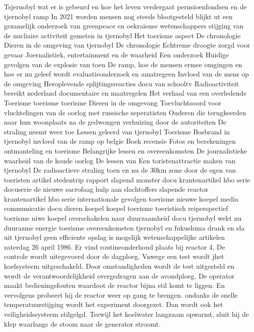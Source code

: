 \cite{INSAVienna1992Chernobyl}
Tsjernobyl
\cite{wikiTjernobyl}
\cite{rivmTjernobyl}
\cite{andereTijdenTjernobyl}
wat er is gebeurd en hoe het leven verdergaat
\cite{kingskey19042022tjernobyl}
pernsioenfondsen en de tjernobyl ramp
In 2021 worden mensen nog steeds blootgesteld blijkt ut een gezamelijk onderzoek van greenpeace en oekraiense wetenschappers
stijging van de nucliaire activiteit gemeten in tjernobyl
Het toerisme  aspect
De chronologie
\cite{erikbork26042023reactor4}
\cite{nosTjernobyl30jaarlater}
Dieren in de omgeving van tjernobyl
De chronologie
Echtreme droogte zorgd voor gevaar
\cite{knmi04052021tjernobylbosbrand}
\cite{dodonovaKVIRisicoTjernobyl}
Joernalistiek, entertainment en de waarheid
\cite{dumarey04062020verhaalTjernobylWaarheid}
Een onderzoek
Huidige gevolgen van de explosie van toen
\cite{sparkesNewScientistTjernoby}
De ramp, hoe de mensen ermee omgingen en hoe er nu geleef wordt
evaluatieonderzoek en amatregeen
\cite{kernenergiened26041986chronologiemaatregelen}
\cite{mapszoneReactor}
Invloed van de mens op de omgeving
Heroplevende splijtingsreacties
docu van schooltv
Radioactiviteit bereikt nederland
documentaire en maatregelen
\cite{kernhistoriek15062021tjernobyl}
Het verhaal van een overledende
Toerisme
toerisme
toerisme
Dieren in de omgevong
Toevluchtsoord voor vluchtelingen van de oorlog met russische seperatisten
Ouderen die terugkeerden naar hun woonplaats na de gedwongen verhuizing door de autoriteiten
De straling neemt weer toe
Lessen geleerd van tjernobyl
\cite{nucleairforumFeitenTjernobyl}
Toerisme
Bosbrand in tjernobyl
invloed van de ramp op belgie
\cite{kernongevalTjernobylFancGov}
Boek recensie
Fotos en berekeningen
ontmanteling en toerisme
Belangrijke lessen en overeenkomsten
De journalistieke waarheid van de koude oorlog
De lessen van
\cite{arendswolters062019lessenTjernobyl}
Een toristenattractie maken van tjernobyl
De radioactieve straling toen en nu
de 30km zone door de ogen van toeristen
artikel
stedentrip
rapport
\cite{damveld08052020tjernobyl}
slapend monster
docu
krantenartikel
hbo serie
docuserie
de  nieuwe sacrofaag
hulp aan slachtoffers
slapende reactor
krantenartikel
\cite{deVriestjernobylHolland}
hbo serie
internationale gevolgen
toerisme
nieuwe koepel
media communicatie
docu
dieren
koepel
koepel
\cite{ing3enieur29042015antistralingskoepel}
toerisme
toeristisch reiperspectief
toerisme
niwe koepel
overschakelen naar duurzaamheid
docu
tjernobyl wekt nu duurazme energie
toerisme
overeenkomsten tjernobyl en fukushima
drank en sla uit tjernobyl
geen efficiente opslag is mogelijk
wetenschappelijke artikelen
zaterdag 26 april 1986. Er vind routineonderhoud plaats bij reactor 4, De controle wordt uitegevoerd door de dagploeg. Vnwege een test wordt jhet koelsysteem uitgeschakeld. Door omstandigheden wordt de test uitgesteld en wordt de verantwoordelijkheid overgedragen aan de avondploeg.
De operator maakt bedieningsfouten waardoot de reactor bijna stil komt te liggen. En vervolgens probeert hij de reactor weer op gang te brengen. ondanks de snelle temperatuurstijging wordt het experiment doorgezet. Dan wordt ook het veiligheidssysteem stilgelgd. Terwijl het koelwater langzaam opwarmt, sluit hij de klep waarlangs de stoom naar de generator stroomt.

